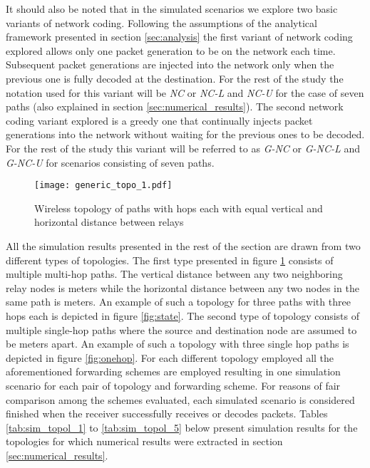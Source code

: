 \documentclass[journal, onecolumn, 12pt]{IEEEtran}
\begin{document}
It should also be noted that in the simulated scenarios we explore two basic variants of network coding.
Following the assumptions of the analytical framework presented in section \ref{sec:analysis} the first variant
of network coding explored allows only one packet generation to be on the network each time.
Subsequent packet generations are injected into the network only when the previous one is fully decoded at the destination.
For the rest of the study the notation used for this variant will be \textit{NC} or \textit{NC-L} and \textit{NC-U} for the case of seven paths (also explained in section \ref{sec:numerical_results}).
The second network coding variant explored is a greedy one that continually injects packet generations into the network without waiting for the previous ones to be decoded.
For the rest of the study this variant will be referred to as \textit{G-NC} or \textit{G-NC-L} and \textit{G-NC-U} for scenarios consisting of seven paths.

\begin{figure}
\begin{center}
\texttt{[image: generic\_topo\_1.pdf]}
\caption{Wireless topology of  paths with  hops each with equal vertical and horizontal distance between relays}
\label{fig:generic_topo_1}
\end{center}
\end{figure}

All the simulation results presented in the rest of the section are drawn from two different types of topologies.
The first type presented in figure \ref{fig:generic_topo_1} consists of multiple multi-hop paths.
The vertical distance between any two neighboring relay nodes is  meters while the horizontal distance between any two nodes in the same path is  meters.
An example of such a topology for three paths with three hops each is depicted in figure \ref{fig:state}.
The second type of topology consists of multiple single-hop paths where the source and destination node are assumed to be  meters apart.
An example of such a topology with three single hop paths is depicted in figure \ref{fig:onehop}.
For each different topology employed all the aforementioned forwarding schemes are employed resulting in one simulation scenario for each pair of
topology and forwarding scheme.
For reasons of fair comparison among the schemes evaluated, each simulated scenario is considered finished when the receiver successfully receives or decodes  packets.
Tables \ref{tab:sim_topol_1} to \ref{tab:sim_topol_5} below present simulation results for the topologies for which numerical results were extracted in section \ref{sec:numerical_results}.
\end{document}
